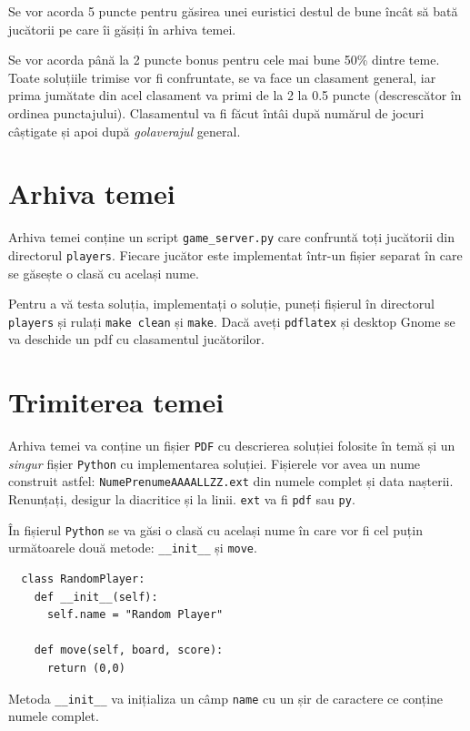 \documentclass[12pt]{article}
\begin{document}
Se vor acorda 5 puncte pentru găsirea unei euristici destul de bune
încât să bată jucătorii pe care îi găsiți în arhiva temei.

Se vor acorda până la 2 puncte bonus pentru cele mai bune 50\% dintre
teme. Toate soluțiile trimise vor fi confruntate, se va face un
clasament general, iar prima jumătate din acel clasament va primi de
la 2 la 0.5 puncte (descrescător în ordinea punctajului). Clasamentul
va fi făcut întâi după numărul de jocuri câștigate și apoi după
\emph{golaverajul} general.

\section{Arhiva temei}
\label{sec:arhiva}

Arhiva temei conține un script \texttt{game\_server.py} care confruntă
toți jucătorii din directorul \texttt{players}. Fiecare jucător este
implementat într-un fișier separat în care se găsește o clasă cu
același nume.

Pentru a vă testa soluția, implementați o soluție, puneți fișierul în
directorul \texttt{players} și rulați \texttt{make clean} și
\texttt{make}. Dacă aveți \texttt{pdflatex} și desktop Gnome se va
deschide un pdf cu clasamentul jucătorilor.

\section{Trimiterea temei}
\label{sec:archive}

Arhiva temei va conține un fișier \texttt{PDF} cu descrierea soluției
folosite în temă și un \emph{singur} fișier \texttt{Python} cu
implementarea soluției. Fișierele vor avea un nume construit astfel:
\texttt{NumePrenumeAAAALLZZ.ext} din numele complet și data
nașterii. Renunțați, desigur la diacritice și la linii. \texttt{ext}
va fi \texttt{pdf} sau \texttt{py}.

În fișierul \texttt{Python} se va găsi o clasă cu același nume în care
vor fi cel puțin următoarele două metode: \texttt{\_\_init\_\_} și \texttt{move}.

\begin{verbatim}
  class RandomPlayer:
    def __init__(self):
      self.name = "Random Player"

    def move(self, board, score):
      return (0,0)
\end{verbatim}

Metoda \texttt{\_\_init\_\_} va inițializa un câmp \texttt{name} cu un șir
de caractere ce conține numele complet.
\end{document}
